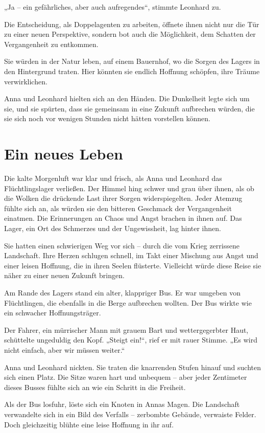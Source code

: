\documentclass[
]{article}
\begin{document}
„Ja -- ein gefährliches, aber auch aufregendes``, stimmte Leonhard zu.

Die Entscheidung, als Doppelagenten zu arbeiten, öffnete ihnen nicht nur die Tür zu einer neuen Perspektive, sondern bot auch die Möglichkeit, dem Schatten der Vergangenheit zu entkommen.

Sie würden in der Natur leben, auf einem Bauernhof, wo die Sorgen des Lagers in den Hintergrund traten. Hier könnten sie endlich Hoffnung schöpfen, ihre Träume verwirklichen.

Anna und Leonhard hielten sich an den Händen. Die Dunkelheit legte sich um sie, und sie spürten, dass sie gemeinsam in eine Zukunft aufbrechen würden, die sie sich noch vor wenigen Stunden nicht hätten vorstellen können.

\section{Ein neues Leben}\label{ein-neues-leben}

Die kalte Morgenluft war klar und frisch, als Anna und Leonhard das Flüchtlingslager verließen. Der Himmel hing schwer und grau über ihnen, als ob die Wolken die drückende Last ihrer Sorgen widerspiegelten. Jeder Atemzug fühlte sich an, als würden sie den bitteren Geschmack der Vergangenheit einatmen. Die Erinnerungen an Chaos und Angst brachen in ihnen auf. Das Lager, ein Ort des Schmerzes und der Ungewissheit, lag hinter ihnen.

Sie hatten einen schwierigen Weg vor sich -- durch die vom Krieg zerrissene Landschaft. Ihre Herzen schlugen schnell, im Takt einer Mischung aus Angst und einer leisen Hoffnung, die in ihren Seelen flüsterte. Vielleicht würde diese Reise sie näher zu einer neuen Zukunft bringen.

Am Rande des Lagers stand ein alter, klappriger Bus. Er war umgeben von Flüchtlingen, die ebenfalls in die Berge aufbrechen wollten. Der Bus wirkte wie ein schwacher Hoffnungsträger.

Der Fahrer, ein mürrischer Mann mit grauem Bart und wettergegerbter Haut, schüttelte ungeduldig den Kopf. „Steigt ein!{\kern0pt}``, rief er mit rauer Stimme. „Es wird nicht einfach, aber wir müssen weiter.``

Anna und Leonhard nickten. Sie traten die knarrenden Stufen hinauf und suchten sich einen Platz. Die Sitze waren hart und unbequem -- aber jeder Zentimeter dieses Busses fühlte sich an wie ein Schritt in die Freiheit.

Als der Bus losfuhr, löste sich ein Knoten in Annas Magen. Die Landschaft verwandelte sich in ein Bild des Verfalls -- zerbombte Gebäude, verwaiste Felder. Doch gleichzeitig blühte eine leise Hoffnung in ihr auf.
\end{document}
